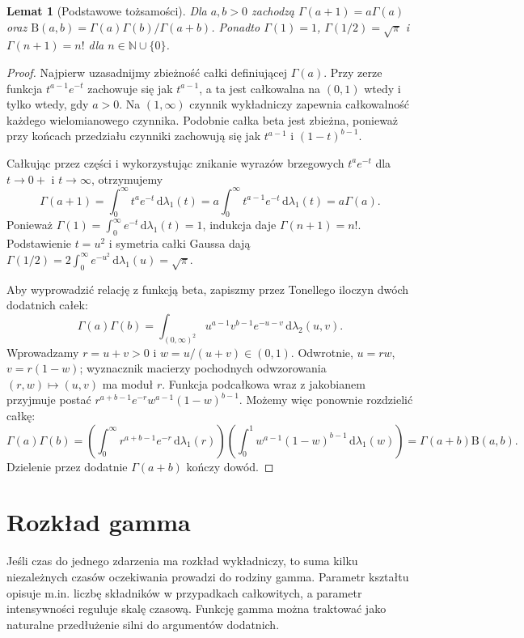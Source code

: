 \documentclass[11pt,a4paper,oneside]{report}
\numberwithin{equation}{chapter}
\theoremstyle{plain}
\newtheorem{lemat}[twierdzenie]{Lemat}
\theoremstyle{definition}
\theoremstyle{remark}
\newcommand{\N}{\mathbb{N}}
\newcommand{\dd}{\mathrm{d}}
\begin{document}
\begin{lemat}[Podstawowe tożsamości]
Dla $a,b>0$ zachodzą
$\Gamma(a+1)=a\Gamma(a)$ oraz
$\mathrm B(a,b)=\Gamma(a)\Gamma(b)/\Gamma(a+b)$.
Ponadto $\Gamma(1)=1$, $\Gamma(1/2)=\sqrt\pi$
i $\Gamma(n+1)=n!$ dla $n\in\N\cup\{0\}$.
\end{lemat}
\begin{proof}
Najpierw uzasadnijmy zbieżność całki definiującej
$\Gamma(a)$. Przy zerze funkcja $t^{a-1}e^{-t}$
zachowuje się jak $t^{a-1}$, a ta jest całkowalna
na $(0,1)$ wtedy i tylko wtedy, gdy $a>0$.
Na $(1,\infty)$ czynnik wykładniczy zapewnia
całkowalność każdego wielomianowego czynnika.
Podobnie całka beta jest zbieżna, ponieważ
przy końcach przedziału czynniki zachowują się
jak $t^{a-1}$ i $(1-t)^{b-1}$.

Całkując przez części i wykorzystując znikanie
wyrazów brzegowych $t^a e^{-t}$ dla $t\to0+$
i $t\to\infty$, otrzymujemy
\[
\Gamma(a+1)=\int_0^\infty t^ae^{-t}\,\dd\lambda_1(t)
=a\int_0^\infty t^{a-1}e^{-t}\,\dd\lambda_1(t)
=a\Gamma(a).
\]
Ponieważ $\Gamma(1)=\int_0^\infty e^{-t}\,\dd\lambda_1(t)=1$,
indukcja daje $\Gamma(n+1)=n!$.
Podstawienie $t=u^2$ i symetria całki Gaussa dają
$\Gamma(1/2)=2\int_0^\infty e^{-u^2}\,\dd\lambda_1(u)
=\sqrt\pi$.

Aby wyprowadzić relację z funkcją beta, zapiszmy
przez Tonellego iloczyn dwóch dodatnich całek:
\[
\Gamma(a)\Gamma(b)
=\int_{(0,\infty)^2}u^{a-1}v^{b-1}e^{-u-v}
\,\dd\lambda_2(u,v).
\]
Wprowadzamy $r=u+v>0$ i $w=u/(u+v)\in(0,1)$.
Odwrotnie, $u=rw$, $v=r(1-w)$; wyznacznik macierzy
pochodnych odwzorowania $(r,w)\mapsto(u,v)$
ma moduł $r$. Funkcja podcałkowa wraz z jakobianem
przyjmuje postać
$r^{a+b-1}e^{-r}w^{a-1}(1-w)^{b-1}$.
Możemy więc ponownie rozdzielić całkę:
\[
\Gamma(a)\Gamma(b)
=\left(\int_0^\infty r^{a+b-1}e^{-r}\,\dd\lambda_1(r)\right)
\left(\int_0^1w^{a-1}(1-w)^{b-1}\,\dd\lambda_1(w)\right)
=\Gamma(a+b)\mathrm B(a,b).
\]
Dzielenie przez dodatnie $\Gamma(a+b)$ kończy dowód.
\end{proof}

\section{Rozkład gamma}
Jeśli czas do jednego zdarzenia ma rozkład wykładniczy, to
suma kilku niezależnych czasów oczekiwania prowadzi do rodziny
gamma. Parametr kształtu opisuje m.in. liczbę składników
w przypadkach całkowitych, a parametr intensywności reguluje
skalę czasową. Funkcję gamma można traktować jako naturalne
przedłużenie silni do argumentów dodatnich.
\end{document}
